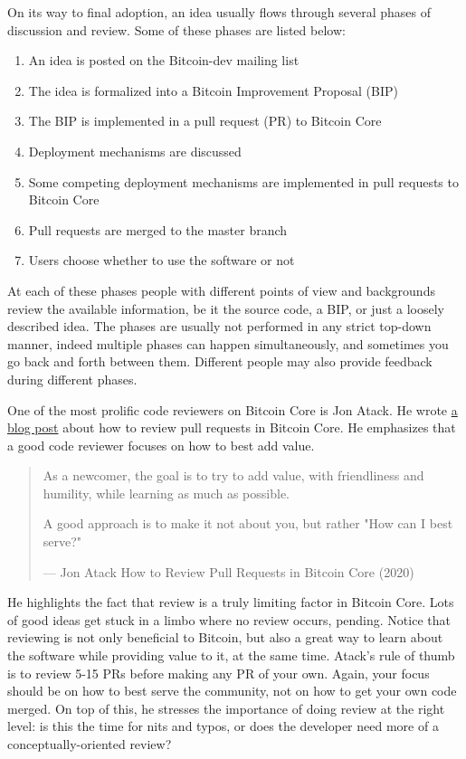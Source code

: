 On its way to final adoption, an idea usually flows through several
phases of discussion and review. Some of these phases are listed below:

\begin{enumerate}
\def\labelenumi{\arabic{enumi}.}
\item
  An idea is posted on the Bitcoin-dev mailing list
\item
  The idea is formalized into a Bitcoin Improvement Proposal (BIP)
\item
  The BIP is implemented in a pull request (PR) to Bitcoin Core
\item
  Deployment mechanisms are discussed
\item
  Some competing deployment mechanisms are implemented in pull requests
  to Bitcoin Core
\item
  Pull requests are merged to the master branch
\item
  Users choose whether to use the software or not
\end{enumerate}

At each of these phases people with different points of view and
backgrounds review the available information, be it the source code, a
BIP, or just a loosely described idea. The phases are usually not
performed in any strict top-down manner, indeed multiple phases can
happen simultaneously, and sometimes you go back and forth between them.
Different people may also provide feedback during different phases.

One of the most prolific code reviewers on Bitcoin Core is Jon Atack. He
wrote
\href{https://jonatack.github.io/articles/how-to-review-pull-requests-in-bitcoin-core}{a
blog post} about how to review pull requests in Bitcoin Core. He
emphasizes that a good code reviewer focuses on how to best add value.

\begin{quote}
As a newcomer, the goal is to try to add value, with friendliness and
humility, while learning as much as possible.

A good approach is to make it not about you, but rather "How can I best
serve?"

---  Jon Atack How to Review Pull Requests in Bitcoin Core (2020)
\end{quote}

He highlights the fact that review is a truly limiting factor in Bitcoin
Core. Lots of good ideas get stuck in a limbo where no review occurs,
pending. Notice that reviewing is not only beneficial to Bitcoin, but
also a great way to learn about the software while providing value to
it, at the same time. Atack's rule of thumb is to review 5-15 PRs before
making any PR of your own. Again, your focus should be on how to best
serve the community, not on how to get your own code merged. On top of
this, he stresses the importance of doing review at the right level: is
this the time for nits and typos, or does the developer need more of a
conceptually-oriented review?

